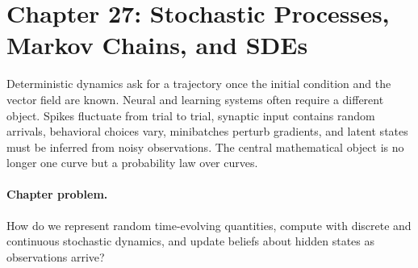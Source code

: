 \section{Chapter 27: Stochastic Processes, Markov Chains, and SDEs}
\label{ch:stochastic-processes-markov-chains-sdes}

Deterministic dynamics ask for a trajectory once the initial condition and the vector field are known. Neural and learning systems often require a different object. Spikes fluctuate from trial to trial, synaptic input contains random arrivals, behavioral choices vary, minibatches perturb gradients, and latent states must be inferred from noisy observations. The central mathematical object is no longer one curve but a probability law over curves.

\paragraph{Chapter problem.}
How do we represent random time-evolving quantities, compute with discrete and continuous stochastic dynamics, and update beliefs about hidden states as observations arrive?

